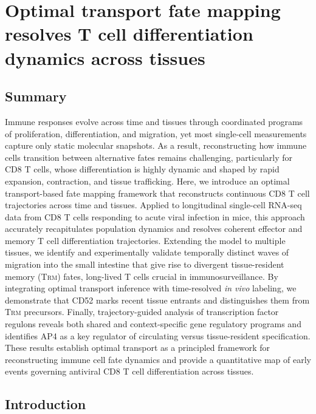 \chapter{Optimal transport fate mapping resolves T cell differentiation
dynamics across tissues}

\section{Summary}

Immune responses evolve across time and tissues through coordinated programs of proliferation, differentiation, and migration, yet most single-cell measurements capture only static molecular snapshots. As a result, reconstructing how immune cells transition between alternative fates remains challenging, particularly for CD8 T cells, whose differentiation is highly dynamic and shaped by rapid expansion, contraction, and tissue trafficking. Here, we introduce an optimal transport-based fate mapping framework that reconstructs continuous CD8 T cell trajectories across time and tissues. Applied to longitudinal single-cell RNA-seq data from CD8 T cells responding to acute viral infection in mice, this approach accurately recapitulates population dynamics and resolves coherent effector and memory T cell differentiation trajectories. Extending the model to multiple tissues, we identify and experimentally validate temporally distinct waves of migration into the small intestine that give rise to divergent tissue-resident memory (T\textsc{rm}) fates, long-lived T cells crucial in immunosurveillance. By integrating optimal transport inference with time-resolved \emph{in vivo} labeling, we demonstrate that CD52 marks recent tissue entrants and distinguishes them from T\textsc{rm} precursors. Finally, trajectory-guided analysis of transcription factor regulons reveals both shared and context-specific gene regulatory programs and identifies AP4 as a key regulator of circulating versus tissue-resident specification. These results establish optimal transport as a principled framework for reconstructing immune cell fate dynamics and provide a quantitative map of early events governing antiviral CD8 T cell differentiation across tissues.

\section{Introduction}

